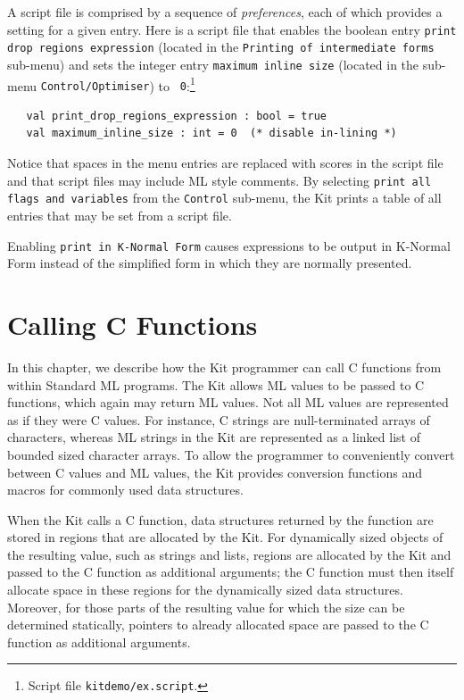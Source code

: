 \documentclass[12pt]{book}
\begin{document}
A script file is comprised by a sequence of 
%
{\em preferences}, each of which provides a setting for a given entry.
Here is a script file that enables the boolean entry {\tt print drop
  regions expression} (located in the {\tt Printing of intermediate
  forms} sub-menu) and sets the integer entry {\tt maximum inline
  size} (located in the sub-menu {\tt Control/Optimiser}) to {\tt
  0}:\footnote{Script file {\tt kitdemo/ex.script}.}
\begin{verbatim}
   val print_drop_regions_expression : bool = true 
   val maximum_inline_size : int = 0  (* disable in-lining *)
\end{verbatim}
Notice that spaces in the menu entries are replaced with scores in the
script file and that script files may include ML style comments. By
selecting {\tt print all flags and variables} from the {\tt Control}
sub-menu, the Kit prints a table of all entries that may be set from a
script file.

Enabling 
%
%
\texttt{print in K-Normal Form} causes expressions to be output in
K-Normal Form instead of the simplified form in which they are
normally presented.


\chapter{Calling C Functions}
\label{ccall.sec}

In this chapter, we describe how the Kit programmer can call 
%
C functions from within Standard ML programs.  The Kit allows ML
values to be passed to C functions, which again may return ML values.
Not all ML values are represented as if they were C values. For
instance, C strings are null-terminated arrays of characters, whereas
ML strings in the Kit are represented as a linked list of bounded
sized character arrays. To allow the programmer to conveniently
convert between C values and ML values, the Kit provides conversion
functions and macros for commonly used data structures.

When the Kit calls a C function, data structures returned by the
function are stored in regions that are allocated by the Kit. For
dynamically sized objects of the resulting value, such as strings and
lists, regions are allocated by the Kit and passed to the C function
as additional arguments; the C function must then itself allocate
space in these regions for the dynamically sized data
structures. Moreover, for those parts of the resulting value for which
the size can be determined statically, pointers to already allocated
space are passed to the C function as additional arguments.
\end{document}
